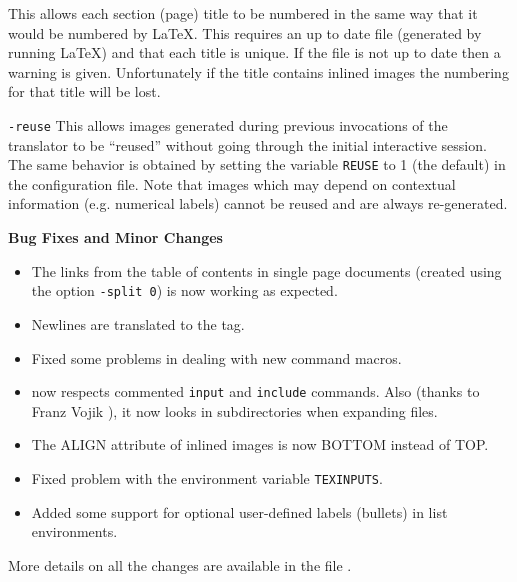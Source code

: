 \begin{htmllist}
\begin{htmllist}
This allows each section (page) title to be numbered in the same 
way that it would be numbered by \LaTeX. This requires 
an up to date  file (generated by running \LaTeX) and that 
each title is unique. If the  file is not up to date then a 
warning is given.
Unfortunately if 
the title contains inlined images the numbering for that title will
be lost. 
\item[\texttt{-reuse}]
This allows images generated during previous invocations of
the translator to be ``reused'' without going through the initial 
interactive session. The same behavior is obtained by setting
the variable \texttt{REUSE} to 1 (the default) in the configuration file.
Note that images which may depend on contextual information (e.g. numerical
labels) cannot be reused and are always re-generated. 
\end{htmllist}
\item[\textbf{Bug Fixes and Minor Changes}] \hfill
\begin{itemize}
\item The links from the table of contents in single page documents (created using
the option \texttt{-split 0}) is now working as expected.
\item Newlines are translated to the  tag.
\item Fixed some problems in dealing with new command macros.
\item {} now respects commented \texttt{input} and 
\texttt{include} commands. Also (thanks to Franz Vojik
), it 
now looks in subdirectories when expanding
files.
\item The ALIGN attribute of inlined images is now BOTTOM instead of
TOP.
\item Fixed problem with the environment variable \texttt{TEXINPUTS}.
\item Added some support for optional user-defined labels (bullets) in
list environments.
\end{itemize}
\end{htmllist}

More details on all the changes are available in the file 
.

